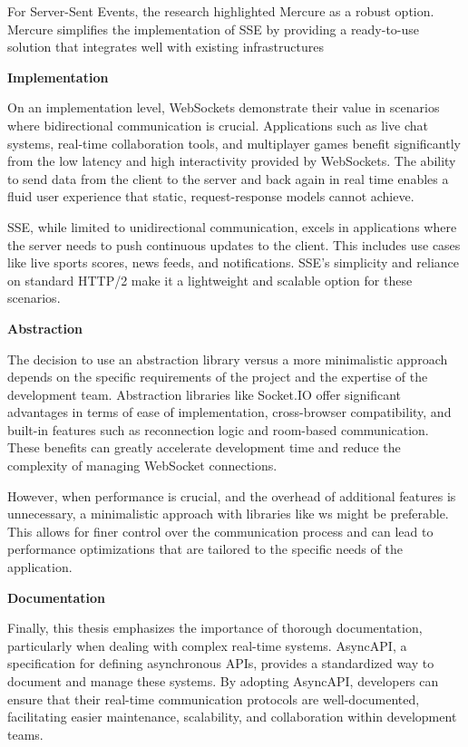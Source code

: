 For Server-Sent Events, the research highlighted Mercure as a robust option. Mercure simplifies the implementation of SSE by providing a ready-to-use solution that integrates well with existing infrastructures

\textbf{Implementation}

On an implementation level, WebSockets demonstrate their value in scenarios where bidirectional communication is crucial. Applications such as live chat systems, real-time collaboration tools, and multiplayer games benefit significantly from the low latency and high interactivity provided by WebSockets. The ability to send data from the client to the server and back again in real time enables a fluid user experience that static, request-response models cannot achieve.

SSE, while limited to unidirectional communication, excels in applications where the server needs to push continuous updates to the client. This includes use cases like live sports scores, news feeds, and notifications. SSE's simplicity and reliance on standard HTTP/2 make it a lightweight and scalable option for these scenarios.

\textbf{Abstraction}

The decision to use an abstraction library versus a more minimalistic approach depends on the specific requirements of the project and the expertise of the development team. Abstraction libraries like Socket.IO offer significant advantages in terms of ease of implementation, cross-browser compatibility, and built-in features such as reconnection logic and room-based communication. These benefits can greatly accelerate development time and reduce the complexity of managing WebSocket connections.

However, when performance is crucial, and the overhead of additional features is unnecessary, a minimalistic approach with libraries like ws might be preferable. This allows for finer control over the communication process and can lead to performance optimizations that are tailored to the specific needs of the application.

\textbf{Documentation}

Finally, this thesis emphasizes the importance of thorough documentation, particularly when dealing with complex real-time systems. AsyncAPI, a specification for defining asynchronous APIs, provides a standardized way to document and manage these systems. By adopting AsyncAPI, developers can ensure that their real-time communication protocols are well-documented, facilitating easier maintenance, scalability, and collaboration within development teams.
